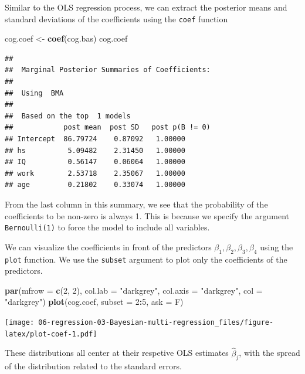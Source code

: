 \documentclass[]{book}
\newenvironment{Shaded}{\begin{snugshade}}{\end{snugshade}}
\newcommand{\KeywordTok}[1]{\textcolor[rgb]{0.13,0.29,0.53}{\textbf{#1}}}
\newcommand{\DataTypeTok}[1]{\textcolor[rgb]{0.13,0.29,0.53}{#1}}
\newcommand{\DecValTok}[1]{\textcolor[rgb]{0.00,0.00,0.81}{#1}}
\newcommand{\StringTok}[1]{\textcolor[rgb]{0.31,0.60,0.02}{#1}}
\newcommand{\OperatorTok}[1]{\textcolor[rgb]{0.81,0.36,0.00}{\textbf{#1}}}
\newcommand{\NormalTok}[1]{#1}
\theoremstyle{definition}
\theoremstyle{definition}
\theoremstyle{definition}
\theoremstyle{remark}
\begin{document}
Similar to the OLS regression process, we can extract the posterior
means and standard deviations of the coefficients using the
\texttt{coef} function

\begin{Shaded}
\begin{Highlighting}[]
\NormalTok{cog.coef <-}\StringTok{ }\KeywordTok{coef}\NormalTok{(cog.bas)}
\NormalTok{cog.coef}
\end{Highlighting}
\end{Shaded}

\begin{verbatim}
## 
##  Marginal Posterior Summaries of Coefficients: 
## 
##  Using  BMA 
## 
##  Based on the top  1 models 
##            post mean  post SD   post p(B != 0)
## Intercept  86.79724    0.87092   1.00000      
## hs          5.09482    2.31450   1.00000      
## IQ          0.56147    0.06064   1.00000      
## work        2.53718    2.35067   1.00000      
## age         0.21802    0.33074   1.00000
\end{verbatim}

From the last column in this summary, we see that the probability of the
coefficients to be non-zero is always 1. This is because we specify the
argument \texttt{Bernoulli(1)} to force the model to include all
variables.

We can visualize the coefficients in front of the predictors
\(\beta_1,\beta_2, \beta_3, \beta_4\) using the \texttt{plot} function.
We use the \texttt{subset} argument to plot only the coefficients of the
predictors.

\begin{Shaded}
\begin{Highlighting}[]
\KeywordTok{par}\NormalTok{(}\DataTypeTok{mfrow =} \KeywordTok{c}\NormalTok{(}\DecValTok{2}\NormalTok{, }\DecValTok{2}\NormalTok{), }\DataTypeTok{col.lab =} \StringTok{"darkgrey"}\NormalTok{, }\DataTypeTok{col.axis =} \StringTok{"darkgrey"}\NormalTok{, }\DataTypeTok{col =} \StringTok{"darkgrey"}\NormalTok{)}
\KeywordTok{plot}\NormalTok{(cog.coef, }\DataTypeTok{subset =} \DecValTok{2}\OperatorTok{:}\DecValTok{5}\NormalTok{, }\DataTypeTok{ask =}\NormalTok{ F)}
\end{Highlighting}
\end{Shaded}

\texttt{[image: 06-regression-03-Bayesian-multi-regression\_files/figure-latex/plot-coef-1.pdf]}

These distributions all center at their respetive OLS estimates
\(\hat{\beta}_j\), with the spread of the distribution related to the
standard errors.
\end{document}
